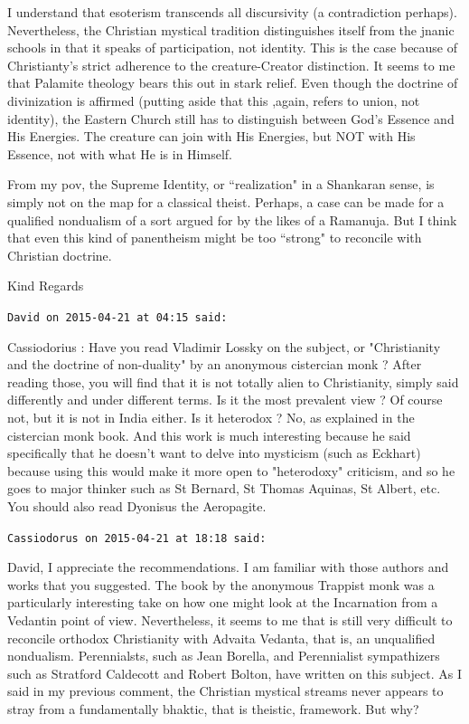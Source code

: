 \begin{footnotesize}
\begin{sffamily}
I understand that esoterism transcends all discursivity (a contradiction perhaps). Nevertheless, the Christian mystical tradition distinguishes itself from the jnanic schools in that it speaks of participation, not identity. This is the case because of Christianty's strict adherence to the creature-Creator distinction. It seems to me that Palamite theology bears this out in stark relief. Even though the doctrine of divinization is affirmed (putting aside that this ,again, refers to union, not identity), the Eastern Church still has to distinguish between God's Essence and His Energies. The creature can join with His Energies, but NOT with His Essence, not with what He is in Himself. 

From my pov, the Supreme Identity, or ``realization" in a Shankaran sense, is simply not on the map for a classical theist. Perhaps, a case can be made for a qualified nondualism of a sort argued for by the likes of a Ramanuja. But I think that even this kind of panentheism might be too ``strong" to reconcile with Christian doctrine.

Kind Regards


\hfill

\texttt{David on 2015-04-21 at 04:15 said: }

Cassiodorius : Have you read Vladimir Lossky on the subject, or "Christianity and the doctrine of non-duality" by an anonymous cistercian monk ? After reading those, you will find that it is not totally alien to Christianity, simply said differently and under different terms. Is it the most prevalent view ? Of course not, but it is not in India either. Is it heterodox ? No, as explained in the cistercian monk book. And this work is much interesting because he said specifically that he doesn't want to delve into mysticism (such as Eckhart) because using this would make it more open to "heterodoxy" criticism, and so he goes to major thinker such as St Bernard, St Thomas Aquinas, St Albert, etc. You should also read Dyonisus the Aeropagite.


\hfill

\texttt{Cassiodorus on 2015-04-21 at 18:18 said: }

David, I appreciate the recommendations. I am familiar with those authors and works that you suggested. The book by the anonymous Trappist monk was a particularly interesting take on how one might look at the Incarnation from a Vedantin point of view. Nevertheless, it seems to me that is still very difficult to reconcile orthodox Christianity with Advaita Vedanta, that is, an unqualified nondualism. Perennialsts, such as Jean Borella, and Perennialist sympathizers such as Stratford Caldecott and Robert Bolton, have written on this subject. As I said in my previous comment, the Christian mystical streams never appears to stray from a fundamentally bhaktic, that is theistic, framework. But why?


\end{sffamily}
\end{footnotesize}
